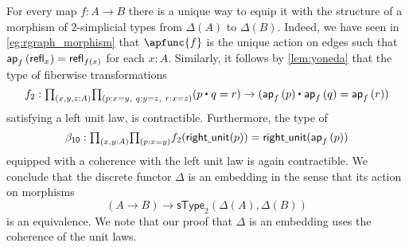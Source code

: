 \begin{eg}
For every map $f:A\to B$ there is a unique way to equip it with the structure of a morphism of $2$-simplicial types from $\Delta(A)$ to $\Delta(B)$. Indeed, we have seen in \cref{eg:rgraph_morphism} that $\apfunc{f}$ is the unique action on edges such that $\mathsf{ap}_{f}\left({\mathsf{refl}_{x}}\right)=\mathsf{refl}_{f(x)}$ for each $x:A$. Similarly, it follows by \cref{lem:yoneda} that the type of fiberwise transformations
\begin{equation*}
f_2 : \prd{x,y,z:A}{p:x=y,\ q:y=z,\ r:x=z} (\ct{p}{q}=r)\to (\ct{\ap{f}{p}}{\ap{f}{q}}=\ap{f}{r})
\end{equation*}
satisfying a left unit law, is contractible. Furthermore, the type of 
\begin{equation*}
\mathsf{\beta_{10}} : \prd{x,y:A}{p:x=y} f_2(\mathsf{right\usc{}unit}(p))= \mathsf{right\usc{}unit}(\ap{f}{p})
\end{equation*}
equipped with a coherence with the left unit law is again contractible. We conclude that the discrete functor $\Delta$ is an embedding in the sense that its action on morphisms
\begin{equation*}
(A\to B)\to \mathsf{sType}_2(\Delta(A),\Delta(B))
\end{equation*}
is an equivalence. We note that our proof that $\Delta$ is an embedding uses the coherence of the unit laws.
\end{eg}

